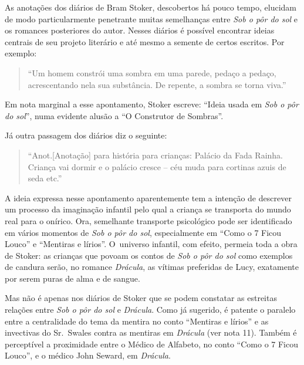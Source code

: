 \asterisc{}


As anotações dos diários de Bram Stoker, descobertos há pouco tempo,
elucidam de modo particularmente penetrante muitas semelhanças entre \emph{Sob
o pôr do sol} e os romances posteriores do autor. Nesses diários é
possível encontrar ideias centrais de seu projeto literário e até mesmo
a semente de certos escritos. Por exemplo:

 

\begin{quote}
``Um homem constrói uma sombra em uma parede, pedaço a pedaço,
acrescentando nela sua substância. De repente, a sombra se torna viva.''

 

\end{quote}
Em nota marginal a esse apontamento, Stoker escreve: ``Ideia usada em
\emph{Sob o pôr do sol}'', numa evidente alusão a ``O Construtor de
Sombras''.

Já outra passagem dos diários diz o seguinte:

 

\begin{quote}
``Anot.{[}Anotação{]} para história para crianças: Palácio da Fada Rainha.
Criança vai dormir e o palácio cresce -- céu muda para cortinas azuis de
seda etc.''

 

\end{quote}
A ideia expressa nesse apontamento aparentemente tem a intenção de
descrever um processo da imaginação infantil pelo qual a criança se
transporta do mundo real para o onírico. Ora, semelhante transporte
psicológico pode ser identificado em vários momentos de \emph{Sob o pôr do
sol}, especialmente em ``Como o 7 Ficou Louco'' e ``Mentiras e lírios''.
O~universo infantil, com efeito, permeia toda a obra de Stoker: as
crianças que povoam os contos de \emph{Sob o pôr do sol} como exemplos de
candura serão, no romance \emph{Drácula}, as vítimas preferidas de Lucy,
exatamente por serem puras de alma e de sangue.

Mas não é apenas nos diários de Stoker que se podem constatar as
estreitas relações entre \emph{Sob o pôr do sol} e \emph{Drácula}. Como já sugerido, é
patente o paralelo entre a centralidade do tema da mentira no conto
``Mentiras e lírios'' e as invectivas do Sr.~Swales contra as mentiras
em \emph{Drácula} (ver nota 11). Também é perceptível a proximidade entre o
Médico de Alfabeto, no conto ``Como o 7 Ficou Louco'', e o médico John
Seward, em \emph{Drácula}.


